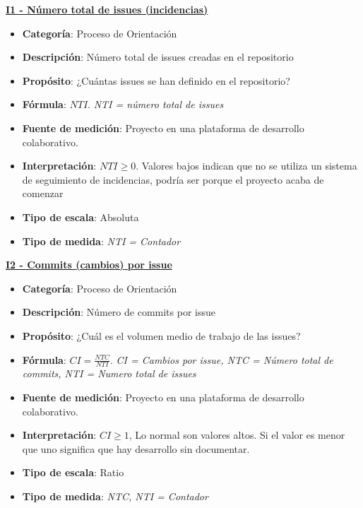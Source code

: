  
\textbf{\underline{I1 - Número total de issues (incidencias)}}

\begin{itemize}
	\tightlist
	\item \textbf{Categoría}: Proceso de Orientación
	\item \textbf{Descripción}: Número total de issues creadas en el repositorio
	\item \textbf{Propósito}: ¿Cuántas issues se han definido en el repositorio?
	\item \textbf{Fórmula}: $NTI$. \textit{NTI = número total de issues}
	\item \textbf{Fuente de medición}: Proyecto en una plataforma de desarrollo colaborativo.
	\item \textbf{Interpretación}: $NTI \geq 0$. Valores bajos indican que no se utiliza un sistema de seguimiento de incidencias, podría ser porque el proyecto acaba de comenzar
	\item \textbf{Tipo de escala}: Absoluta
	\item \textbf{Tipo de medida}: \textit{NTI = Contador}
\end{itemize}

\textbf{\underline{I2 - Commits (cambios) por issue}}

\begin{itemize}
	\tightlist
	\item \textbf{Categoría}: Proceso de Orientación
	\item \textbf{Descripción}: Número de commits por issue
	\item \textbf{Propósito}: ¿Cuál es el volumen medio de trabajo de las issues?
	\item \textbf{Fórmula}: $CI = \frac{NTC}{NTI}$. \textit{CI = Cambios por issue, NTC = Número total de commits, NTI = Numero total de issues}
	\item \textbf{Fuente de medición}: Proyecto en una plataforma de desarrollo colaborativo.
	\item \textbf{Interpretación}: $CI \geq 1$, Lo normal son valores altos. Si el valor es menor que uno significa que hay desarrollo sin documentar.
	\item \textbf{Tipo de escala}: Ratio 
	\item \textbf{Tipo de medida}: \textit{NTC, NTI = Contador}
\end{itemize}

